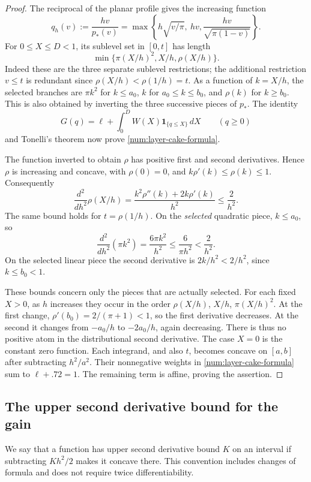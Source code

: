 \begin{proof}
The reciprocal of the planar profile gives the increasing function
\[
 q_h(v):=\frac{hv}{p_*(v)}=
 \max\left\{h\sqrt{v/\pi},\ hv,
             \frac{hv}{\sqrt{\pi(1-v)}}\right\}.
\]
For $0\le X\le D<1$, its sublevel set in $[0,t]$ has length
\[
 \min\{\pi(X/h)^2,X/h,\rho(X/h)\}.
\]
Indeed these are the three separate sublevel restrictions; the additional
restriction $v\le t$ is redundant since
$\rho(X/h)<\rho(1/h)=t$. As a function of $k=X/h$, the selected
branches are $\pi k^2$ for $k\le a_0$, $k$ for
$a_0\le k\le b_0$, and $\rho(k)$ for $k\ge b_0$.
This is also obtained by inverting the three successive pieces of
$p_*$. The identity
\[
 G(q)=\ell+\int_0^D W(X)\mathbf 1_{\{q\le X\}}\,dX
 \qquad(q\ge0)
\]
and Tonelli's theorem now prove \eqref{num:layer-cake-formula}.

The function inverted to obtain $\rho$ has positive first and second
derivatives. Hence $\rho$ is increasing and concave, with $\rho(0)=0$,
and $k\rho'(k)\le\rho(k)\le1$. Consequently
\[
 \frac{d^2}{dh^2}\rho(X/h)
 =\frac{k^2\rho''(k)+2k\rho'(k)}{h^2}\le\frac2{h^2}.
\]
The same bound holds for $t=\rho(1/h)$. On the \emph{selected}
quadratic piece, $k\le a_0$, so
\[
 \frac{d^2}{dh^2}(\pi k^2)=\frac{6\pi k^2}{h^2}
 \le\frac6{\pi h^2}<\frac2{h^2}.
\]
On the selected linear piece the second derivative is
$2k/h^2<2/h^2$, since $k\le b_0<1$.

These bounds concern only the pieces that are actually selected.
For each fixed $X>0$, as $h$ increases they occur in the order
$\rho(X/h)$, $X/h$, $\pi(X/h)^2$. At the first change,
$\rho'(b_0)=2/(\pi+1)<1$, so the first derivative decreases.
At the second it changes from $-a_0/h$ to $-2a_0/h$,
again decreasing. There is thus no positive atom in the distributional
second derivative. The case $X=0$ is the constant zero function.
Each integrand, and also $t$, becomes concave on $[a,b]$ after
subtracting $h^2/a^2$. Their nonnegative weights in
\eqref{num:layer-cake-formula} sum to $\ell+.72=1$.
The remaining term is affine, proving the assertion.
\end{proof}

\subsection{The upper second derivative bound for the gain}

We say that a function has upper second derivative bound $K$ on an
interval if subtracting $Kh^2/2$ makes it concave there. This convention
includes changes of formula and does not require twice differentiability.

